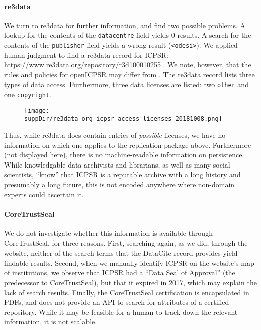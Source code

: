 \paragraph{re3data}
We turn to re3data for further information, and find two possible problems. A lookup for the contents of the \texttt{datacentre} field yields 0 results. A search for the contents of the \texttt{publisher} field yields a wrong result (\lstinline|<odesi>|). We applied human judgment to find a re3data record for ICPSR: \url{https://www.re3data.org/repository/r3d100010255} \parencite{Re3data-icpsr}. We note, however, that the rules and policies for openICPSR may differ from .
The re3data record lists three types of data access. Furthermore, three data licenses are listed: two \texttt{other} and one \texttt{copyright}.
\begin{figure}[H]
	\texttt{[image: \\suppDir/re3data-org-icpsr-access-licenses-20181008.png]}
\end{figure}
Thus, while re3data does contain entries of \textit{possible} licenses, we have no information on which one applies to the replication package above. Furthermore (not displayed here), there is no machine-readable information on persistence. While knowledgable data archivists and librarians, as well as many social scientists, ``know'' that ICPSR is a reputable archive with a long history and presumably a long future, this is not encoded anywhere where non-domain experts could ascertain it.

\paragraph{CoreTrustSeal}
We do not investigate whether this information is available  through CoreTrustSeal, for three reasons. First, searching again, as we did, through the website, neither of the search terms that the DataCite record provides yield findable results. Second, when we manually identify ICPSR on the website's map of institutions, we observe that ICPSR had a ``Data Seal of Approval'' (the predecessor to CoreTrustSeal), but that it expired in 2017, which may explain the lack of search results. Finally, the CoreTrustSeal certification is encapsulated in PDFs, and does not provide an API to search for attributes of a certified repository. While it may be feasible for a human to track down the relevant information, it is not scalable.
\FloatBarrier

